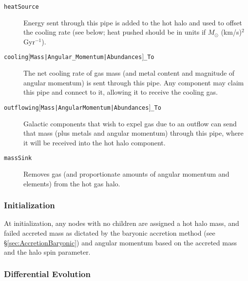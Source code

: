 \begin{description}
 \item [{\tt heatSource}] Energy sent through this pipe is added to the hot halo and used to offset the cooling rate (see below; heat pushed should be in units if $M_\odot$ (km/s)$^2$ Gyr$^{-1}$).
 \item [{\tt cooling$[$Mass|Angular\_Momentum|Abundances$]$\_To}] The net cooling rate of gas mass (and metal content and magnitude of angular momentum) is sent through this pipe. Any \gls{component} may claim this pipe and connect to it, allowing it to receive the cooling gas.
 \item [{\tt outflowing$[$Mass|AngularMomentum|Abundances$]$\_To}] Galactic components that wish to expel gas due to an outflow can send that mass (plus metals and angular momentum) through this pipe, where it will be received into the hot halo component. 
 \item [{\tt massSink}] Removes gas (and proportionate amounts of angular momentum and elements) from the hot gas halo.
\end{description}

\subsubsection{Initialization}

At initialization, any nodes with no children are assigned a hot halo mass, and failed accreted mass as dictated by the baryonic accretion method (see \S\ref{sec:AccretionBaryonic}) and angular momentum based on the accreted mass and the halo spin parameter.

\subsubsection{Differential Evolution}

